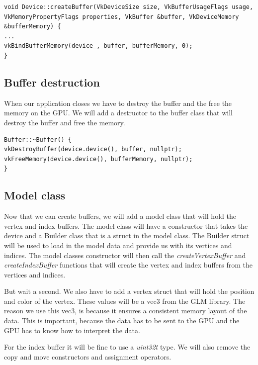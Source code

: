 \documentclass[12pt]{report} \usepackage{preamble}
\begin{document}
\begin{lstlisting}[Language=C++]
void Device::createBuffer(VkDeviceSize size, VkBufferUsageFlags usage, VkMemoryPropertyFlags properties, VkBuffer &buffer, VkDeviceMemory &bufferMemory) {
...
vkBindBufferMemory(device_, buffer, bufferMemory, 0);
}
\end{lstlisting}

\subsection{Buffer destruction}

When our application closes we have to destroy the buffer and the free the memory on the GPU. We will add a destructor to the buffer class that will destroy the buffer and free the memory.

\begin{lstlisting}[Language=C++]
Buffer::~Buffer() {
vkDestroyBuffer(device.device(), buffer, nullptr);
vkFreeMemory(device.device(), bufferMemory, nullptr);
}
\end{lstlisting}

\subsection{Model class}

Now that we can create buffers, we will add a model class that will hold the vertex and index buffers. The model class will have a constructor that takes the device and a Builder class that
is a struct in the model class. The Builder struct will be used to load in the model data and provide us with its vertices and indices. The model classes constructor will then
call the \textit{createVertexBuffer} and \textit{createIndexBuffer} functions that will create the vertex and index buffers from the vertices and indices.

But wait a second. We also have to add a vertex struct that will hold the position and color of the vertex.
These values will be a vec3 from the \ac{GLM} library. The reason we use this vec3, is because
it ensures a consistent memory layout of the data. This is important, because the data has to be sent to the GPU and the GPU has to know how to interpret the data.

For the index buffer it will be fine to use a \textit{uint32\textunderscore t} type.
We will also remove the copy and move constructors and assignment operators.
\end{document}

